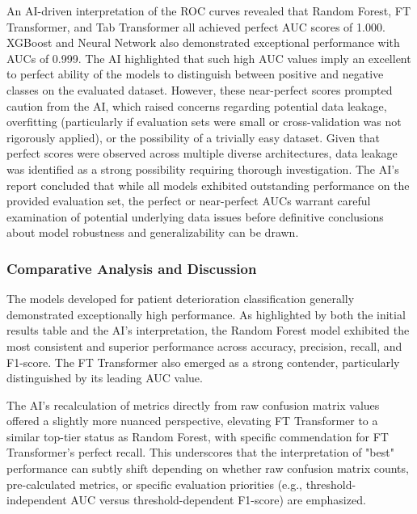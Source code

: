 An AI-driven interpretation of the ROC curves revealed that Random Forest, FT Transformer, and Tab Transformer all achieved perfect AUC scores of 1.000. XGBoost and Neural Network also demonstrated exceptional performance with AUCs of 0.999. The AI highlighted that such high AUC values imply an excellent to perfect ability of the models to distinguish between positive and negative classes on the evaluated dataset. However, these near-perfect scores prompted caution from the AI, which raised concerns regarding potential data leakage, overfitting (particularly if evaluation sets were small or cross-validation was not rigorously applied), or the possibility of a trivially easy dataset. Given that perfect scores were observed across multiple diverse architectures, data leakage was identified as a strong possibility requiring thorough investigation. The AI's report concluded that while all models exhibited outstanding performance on the provided evaluation set, the perfect or near-perfect AUCs warrant careful examination of potential underlying data issues before definitive conclusions about model robustness and generalizability can be drawn.

\subsubsection{Comparative Analysis and Discussion}

The models developed for patient deterioration classification generally demonstrated exceptionally high performance. As highlighted by both the initial results table and the AI's interpretation, the Random Forest model exhibited the most consistent and superior performance across accuracy, precision, recall, and F1-score. The FT Transformer also emerged as a strong contender, particularly distinguished by its leading AUC value.

The AI's recalculation of metrics directly from raw confusion matrix values offered a slightly more nuanced perspective, elevating FT Transformer to a similar top-tier status as Random Forest, with specific commendation for FT Transformer's perfect recall. This underscores that the interpretation of "best" performance can subtly shift depending on whether raw confusion matrix counts, pre-calculated metrics, or specific evaluation priorities (e.g., threshold-independent AUC versus threshold-dependent F1-score) are emphasized.


